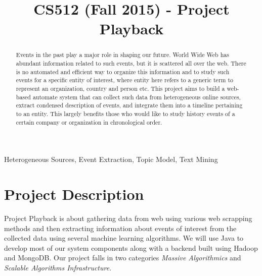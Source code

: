 \documentclass[10pt,conference]{IEEEtran}
\begin{document}
\title{CS512 (Fall 2015) - Project Playback}

\author{%
\and
{}
\and
{}
}

\maketitle

\begin{abstract}
\textnormal{%
Events in the past play a major role in shaping our future. World Wide Web has
abundant information related to such events, but it is scattered all over the
web. There is no automated and efficient way to organize this information and
to study such events for a specific entity of interest, where entity here
refers to a generic term to represent an organization, country and person etc.
This project aims to build a web-based automate system that can collect such
data from heterogeneous online sources, extract condensed description of
events, and integrate them into a timeline pertaining to an entity. This
largely benefits those who would like to study history events of a certain
company or organization in chronological order. 
}
\end{abstract}

\begin{IEEEkeywords}
  \textnormal{Heterogeneous Sources, Event Extraction, Topic Model, Text Mining}
\end{IEEEkeywords}

\IEEEpeerreviewmaketitle

\section{Project Description}\label{sec:project-description}

Project Playback is about gathering data from web using various web scrapping
methods and then extracting information about events of interest from the
collected data using several machine learning algorithms. We will use Java
to develop most of our system components along with a backend built using
Hadoop and MongoDB. Our project falls in two categories \textit{Massive
Algorithmics} and \textit{Scalable Algorithms Infrastructure}.
\end{document}

